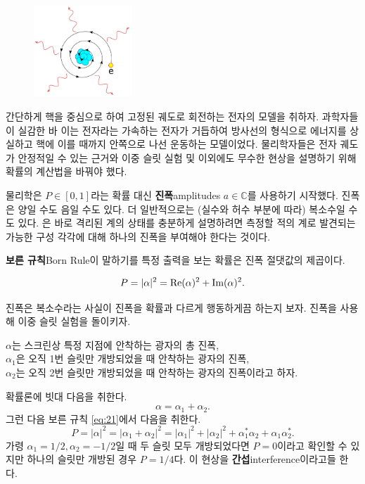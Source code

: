 \documentclass[a4paper,chapter,kosection,atbegshi,hidelinks,itemph]{oblivoir}
\begin{document}
\begin{figure}
    \centering
    \includegraphics[width=0.33\textwidth]{iqis1_008}
\end{figure}

간단하게 핵을 중심으로 하여 고정된 궤도로 회전하는 전자의 모델을 취하자.
과학자들이 실감한 바 이는 전자라는 가속하는 전자가 거듭하여 방사선의
형식으로 에너지를 상실하고 핵에 이를 때까지 안쪽으로 나선 운동하는 모델이었다.
물리학자들은 전자 궤도가 안정적일 수 있는 근거와 이중 슬릿 실험 및 이외에도
무수한 현상을 설명하기 위해 확률의 계산법을 바꿔야 했다. 

물리학은 $P\in[0,1]$라는 확률 대신 \textbf{진폭}{\footnotesize amplitudes}
$a\in\mathbb{C}$를 사용하기 시작했다. 진폭은 양일 수도 음일 수도 있다. 더
일반적으로는 (실수와 허수 부분에 따라) 복소수일 수도 있다. 은 바로 격리된 계의 상태를 충분하게 설명하려면 측정할 적의 계로
발견되는 가능한 구성 각각에 대해 하나의 진폭을 부여해야 한다는 것이다.

\textbf{보른 규칙}{\footnotesize Born Rule}이 말하기를 특정 출력을 보는 확률은
진폭 절댓값의 제곱이다.

\begin{equation}{\label{eq:21}}
  P = |\alpha|^2=\textrm{Re}(\alpha)^2+\textrm{Im}(\alpha)^2.
\end{equation}

진폭은 복소수라는 사실이 진폭을 확률과 다르게 행동하게끔 하는지 보자. 진폭을
사용해 이중 슬릿 실험을 돌이키자.

\hfill
\hfill\parbox[t]{12cm}{
  $\alpha$는 스크린상 특정 지점에 안착하는 광자의 총 진폭,\\
  $\alpha_1$은 오직 1번 슬릿만 개방되었을 때 안착하는 광자의 진폭,\\
  $\alpha_2$는 오직 2번 슬릿만 개방되었을 때 안착하는 광자의 진폭이라고 하자.
}

\hfill\break
확률론에 빗대 다음을 취한다.
\begin{equation}
  \alpha = \alpha_1+\alpha_2.
\end{equation}
그런 다음 보른 규칙 \ref{eq:21}에서 다음을 취한다.
\begin{equation}
  P = |\alpha|^2=|\alpha_1+\alpha_2|^2=|\alpha_1|^2+|\alpha_2|^2+
  \alpha_1^*\alpha_2+\alpha_1\alpha_2^*.
\end{equation}
가령 $\alpha_1=1/2, \alpha_2=-1/2$일 때 두 슬릿 모두 개방되었다면 $P=0$이라고
확인할 수 있지만 하나의 슬릿만 개방된 경우 $P=1/4$다. 이 현상을
\textbf{간섭}{\footnotesize interference}이라고들 한다.
\end{document}
